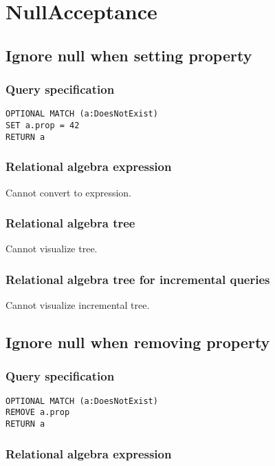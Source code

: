 \section{NullAcceptance}

\subsection{Ignore null when setting property}

\subsubsection*{Query specification}

\begin{lstlisting}
OPTIONAL MATCH (a:DoesNotExist)
SET a.prop = 42
RETURN a
\end{lstlisting}

\subsubsection*{Relational algebra expression}

Cannot convert to expression.

\subsubsection*{Relational algebra tree}

Cannot visualize tree.

\subsubsection*{Relational algebra tree for incremental queries}

Cannot visualize incremental tree.

\subsection{Ignore null when removing property}

\subsubsection*{Query specification}

\begin{lstlisting}
OPTIONAL MATCH (a:DoesNotExist)
REMOVE a.prop
RETURN a
\end{lstlisting}

\subsubsection*{Relational algebra expression}

